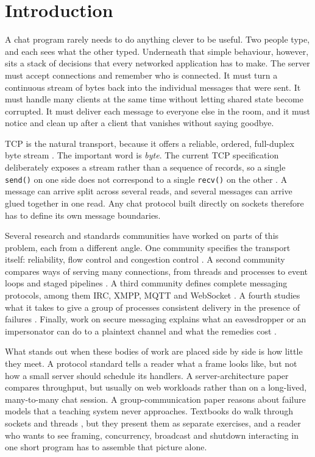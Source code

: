 \documentclass[conference]{IEEEtran}
\newcommand{\code}[1]{\texttt{#1}}
\begin{document}
\section{Introduction}
A chat program rarely needs to do anything clever to be useful. Two people type, and each sees what the other typed. Underneath that simple behaviour, however, sits a stack of decisions that every networked application has to make. The server must accept connections and remember who is connected. It must turn a continuous stream of bytes back into the individual messages that were sent. It must handle many clients at the same time without letting shared state become corrupted. It must deliver each message to everyone else in the room, and it must notice and clean up after a client that vanishes without saying goodbye.

TCP is the natural transport, because it offers a reliable, ordered, full-duplex byte stream \cite{rfc9293,rfc793}. The important word is \emph{byte}. The current TCP specification deliberately exposes a stream rather than a sequence of records, so a single \code{send()} on one side does not correspond to a single \code{recv()} on the other \cite{rfc9293,stevens}. A message can arrive split across several reads, and several messages can arrive glued together in one read. Any chat protocol built directly on sockets therefore has to define its own message boundaries.

Several research and standards communities have worked on parts of this problem, each from a different angle. One community specifies the transport itself: reliability, flow control and congestion control \cite{rfc9293,jacobson,rfc5681}. A second community compares ways of serving many connections, from threads and processes to event loops and staged pipelines \cite{flash,seda,vonbehren,ousterhout,kegel}. A third community defines complete messaging protocols, among them IRC, XMPP, MQTT and WebSocket \cite{rfc1459,rfc6120,mqtt5,rfc6455}. A fourth studies what it takes to give a group of processes consistent delivery in the presence of failures \cite{birman87,birman93,eugster}. Finally, work on secure messaging explains what an eavesdropper or an impersonator can do to a plaintext channel and what the remedies cost \cite{rfc8446,unger,signal}.

What stands out when these bodies of work are placed side by side is how little they meet. A protocol standard tells a reader what a frame looks like, but not how a small server should schedule its handlers. A server-architecture paper compares throughput, but usually on web workloads rather than on a long-lived, many-to-many chat session. A group-communication paper reasons about failure models that a teaching system never approaches. Textbooks do walk through sockets and threads \cite{stevens,tanenbaum,kurose}, but they present them as separate exercises, and a reader who wants to see framing, concurrency, broadcast and shutdown interacting in one short program has to assemble that picture alone.
\end{document}
